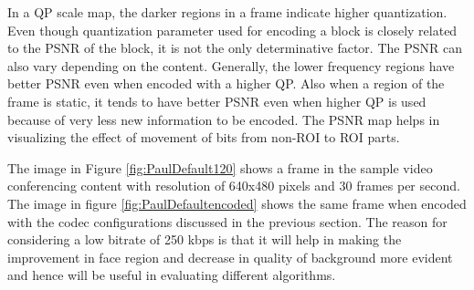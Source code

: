 \documentclass[11pt]{article} %
\begin{document}
In a QP scale map, the darker regions in a frame indicate higher quantization. Even though quantization parameter used for encoding a block is closely related to the PSNR of the block, it is not the only determinative factor. The PSNR can also vary depending on the content. Generally, the lower frequency regions have better PSNR even when encoded with a higher QP. Also when a region of the frame is static, it tends to have better PSNR even when higher QP is used because of very less new information to be encoded. The PSNR map helps in visualizing the effect of movement of bits from non-ROI to ROI parts.

The image in Figure \ref{fig:PaulDefault120} shows a frame in the sample video conferencing content with resolution of 640x480 pixels and 30 frames per second. The image in figure \ref{fig:PaulDefaultencoded} shows the same frame when encoded with the codec configurations discussed in the previous section. The reason for considering a low bitrate of 250 kbps is that it will help in making the improvement in face region and decrease in quality of background more evident and hence will be useful in evaluating different algorithms. 
\end{document}
